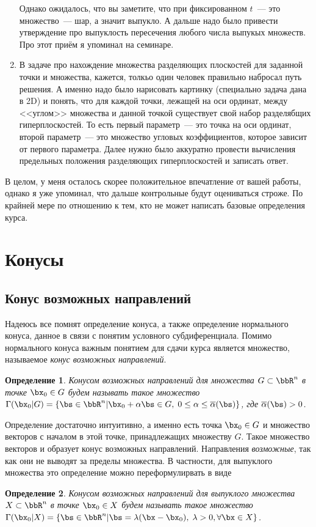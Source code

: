 \documentclass[12pt]{article}
\newtheorem{Def}{ Определение}
\begin{document}
\begin{enumerate}
Однако ожидалось, что вы заметите, что при фиксированном $t$~---  это множество~--- шар, а значит выпукло.
А дальше надо было привести утверждение про выпуклость пересечения любого числа выпукых множеств.
Про этот приём я упоминал на семинаре.
\item В задаче про нахождение множества разделяющих плоскостей для заданной точки и множества, кажется, толкьо один человек правильно набросал путь решения. 
А именно надо было нарисовать картинку (специально задача дана в 2D) и понять, что для каждой точки, лежащей на оси ординат, между <<углом>> множества и данной точкой существует свой набор разделябщих гиперплоскостей.
То есть первый параметр~--- это точка на оси ординат, второй параметр~--- это множество угловых коэффициентов, которое зависит от первого параметра.
Далее нужно было аккуратно провести вычисления предельных положения разделяющих гиперплоскостей и записать ответ.   
\end{enumerate}

В целом, у меня осталось скорее положительное впечатление от вашей работы, однако я уже упоминал, что дальше контрольные будут оцениваться строже.
По крайней мере по отношению к тем, кто не может написать базовые определения курса.

\section{Конусы}
\subsection{Конус возможных направлений}
Надеюсь все помнят определение конуса, а также определение нормального конуса, данное в связи с понятим условного субдиференциала.
Помимо нормального конуса важным понятием для сдачи курса является множество, называемое \emph{конус возможных направлений}.
\begin{Def}
Конусом возможных направлений для множества $G \subset \bbR^n$ в точке $\bx_0 \in G$ будем называть такое множество $\Gamma(\bx_0 | G) = \{ \bs \in \bbR^n | \bx_0 + \alpha\bs \in G, \; 0 \leq \alpha \leq \overline{\alpha}(\bs) \}$, где $\overline{\alpha}(\bs) > 0$.
\end{Def}
Определение достаточно интуитивно, а именно есть точка $\bx_0 \in G$ и множество векторов с началом в этой точке, принадлежащих множеству $G$.
Такое множество векторов и образует конус возможных направлений.
Направления \emph{возможные}, так как они не выводят за пределы множества.
В частности, для выпуклого множества это определение можно переформулирвать в виде
\begin{Def}
Конусом возможных направлений для выпуклого множества $X \subset \bbR^n$ в точке $\bx_0 \in X$ будем называть такое множество $\Gamma(\bx_0 | X) = \{ \bs \in \bbR^n | \bs = \lambda (\bx - \bx_0), \; \lambda > 0, \forall \bx \in X \}$.
\end{Def}
\end{document}
